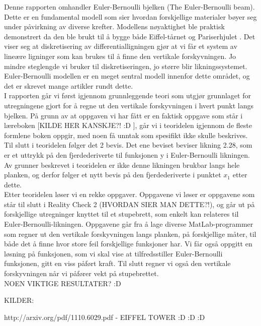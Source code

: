 Denne rapporten omhandler Euler-Bernoulli bjelken (The Euler-Bernoulli beam). Dette er en fundamental modell som sier hvordan forskjellige materialer bøyer seg under påvirkning av diverse krefter. Modellens nøyaktighet ble praktisk demonstrert da den ble brukt til å bygge både Eiffel-tårnet og Pariserhjulet \cite{NdogmoEB}.  Det viser seg at diskretisering av differentialligningen gjør at vi får et system av lineære ligninger som kan brukes til å finne den vertikale forskyvningen. Jo mindre steglengde vi bruker til diskretiseringen, jo større blir likningssystemet. Euler-Bernoulli modellen er en meget sentral modell innenfor dette området, og det er skrevet mange artikler rundt dette. \\

I rapporten går vi først igjennom grunnleggende teori som utgjør grunnlaget for utregningene gjort for å regne ut den vertikale forskyvningen i hvert punkt langs bjelken. På grunn av at oppgaven vi har fått er en faktisk oppgave som står i læreboken [KILDE HER KANSKJE?! :D ], går vi i teoridelen igjennom de fleste formlene boken oppgir, med noen få unntak som spesifikt ikke skulle beskrives. Til slutt i teoridelen følger det 2 bevis. Det ene beviset beviser likning 2.28, som er et uttrykk på den fjerdederiverte til funksjonen y i Euler-Bernoulli likningen. Av grunner beskrevet i teoridelen er ikke denne likningen brukbar langs hele planken, og derfor følger et nytt bevis på den fjerdederiverte i punktet $x_1$ etter dette. \\

Etter teoridelen løser vi en rekke oppgaver. Oppgavene vi løser er oppgavene som står til slutt i Reality Check 2 (HVORDAN SIER MAN DETTE?!), og går ut på forskjellige utregninger knyttet til et stupebrett, som enkelt kan relateres til Euler-Bernoulli-likningen. Oppgavene går fra å lage diverse MatLab-programmer som regner ut den vertikale forskyvningen langs planken, på forskjellige måter, til både det å finne hvor store feil forskjellige funksjoner har. Vi får også oppgitt en løsning på funksjonen, som vi skal vise at tilfredsstiller Euler-Bernoulli funksjonen, gitt en viss påført kraft. Til slutt regner vi også den vertikale forskyvningen når vi påfører vekt på stupebrettet. \\ 

NOEN VIKTIGE RESULTATER? :D 

KILDER: 

http://arxiv.org/pdf/1110.6029.pdf - EIFFEL TOWER :D :D :D 